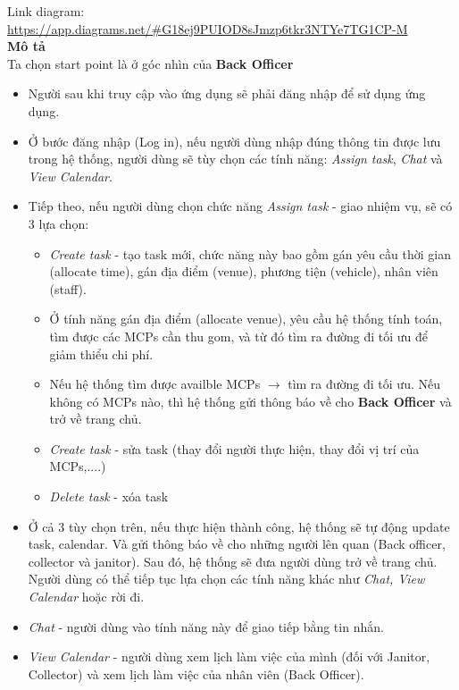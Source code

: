 \documentclass[a4paper]{article}
\begin{document}
Link diagram: \url{https://app.diagrams.net/#G18ej9PUIOD8sJmzp6tkr3NTYe7TG1CP-M}
\vspace{0.5cm}
\\
\textbf{Mô tả}\\
Ta chọn start point là ở góc nhìn của \textbf{Back Officer}
\begin{itemize}
    \item Người sau khi truy cập vào ứng dụng sẽ phải đăng nhập để sử dụng ứng dụng.
    \item Ở bước đăng nhập (Log in), nếu người dùng nhập đúng thông tin được lưu trong hệ thống, người dùng sẽ tùy chọn các tính năng: \textit{Assign task}, \textit{Chat} và \textit{View Calendar}.
    \item Tiếp theo, nếu người dùng chọn chức năng \textit{Assign task} - giao nhiệm vụ, sẽ có 3 lựa chọn:
    \begin{itemize}
        \item \textit{Create task} - tạo task mới, chức năng này bao gồm gán yêu cầu thời gian (allocate time), gán địa điểm (venue), phương tiện (vehicle), nhân viên (staff). 
        \item[] Ở tính năng gán địa điểm (allocate venue), yêu cầu hệ thống tính toán, tìm được các MCPs cần thu gom, và từ đó tìm ra đường đi tối ưu để giảm thiểu chi phí.
        \item[] Nếu hệ thống tìm được availble MCPs $\rightarrow$ tìm ra đường đi tối ưu. Nếu không có MCPs nào, thì hệ thống gửi thông báo về cho \textbf{Back Officer} và trở về trang chủ.
        \item \textit{Create task} - sửa task (thay đổi người thực hiện, thay đổi vị trí của MCPs,....)
        \item \textit{Delete task} - xóa task
    \end{itemize}
        \item[] Ở cả 3 tùy chọn trên, nếu thực hiện thành công, hệ thống sẽ tự động update task, calendar. Và gửi thông báo về cho những người lên quan (Back officer, collector và janitor). Sau đó, hệ thống sẽ đưa người dùng trở về trang chủ. Người dùng có thể tiếp tục lựa chọn các tính năng khác như \textit{Chat, View Calendar} hoặc rời đi.
    \item \textit{Chat} - người dùng vào tính năng này để giao tiếp bằng tin nhắn.
    \item \textit{View Calendar} - người dùng xem lịch làm việc của mình (đối với Janitor, Collector) và xem lịch làm việc của nhân viên (Back Officer).
\end{itemize}
\end{document}
